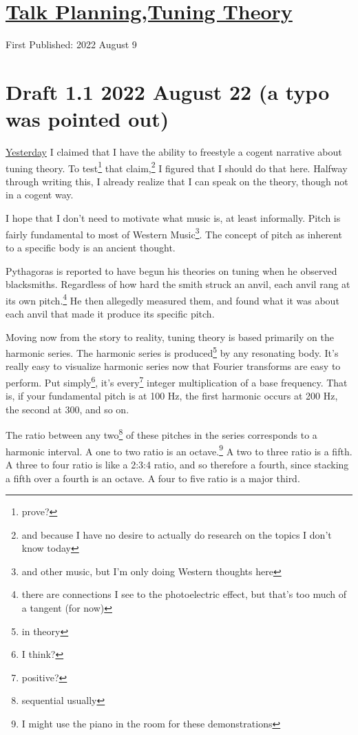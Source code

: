 \documentclass[12pt]{article}[titlepage]
\newcommand{\1}{\={a}}
\newcommand{\2}{\={e}}
\newcommand{\3}{\={\i}}
\newcommand{\4}{\=o}
\newcommand{\5}{\=u}
\newcommand{\6}{\={A}}
\renewcommand{\,}{\textsuperscript{,}}
\begin{document}
\doublespacing
\section{\href{talk-planning-2.html}{Talk Planning,Tuning Theory}}
First Published: 2022 August 9
\section{Draft 1.1 2022 August 22 (a typo was pointed out)}
\href{talk-planning-1.html}{Yesterday} I claimed that I have the ability to freestyle a cogent narrative about tuning theory.
To test\footnote{prove?} that claim,\footnote{and because I have no desire to actually do research on the topics I don't know today} I figured that I should do that here.
Halfway through writing this, I already realize that I can speak on the theory, though not in a cogent way.

I hope that I don't need to motivate what music is, at least informally.
Pitch is fairly fundamental to most of Western Music\footnote{and other music, but I'm only doing Western thoughts here}.
The concept of pitch as inherent to a specific body is an ancient thought.

Pythagoras is reported to have begun his theories on tuning when he observed blacksmiths.
Regardless of how hard the smith struck an anvil, each anvil rang at its own pitch.\footnote{there are connections I see to the photoelectric effect, but that's too much of a tangent (for now)}
He then allegedly measured them, and found what it was about each anvil that made it produce its specific pitch.

Moving now from the story to reality, tuning theory is based primarily on the harmonic series.
The harmonic series is produced\footnote{in theory} by any resonating body.
It's really easy to visualize harmonic series now that Fourier transforms are easy to perform.
Put simply\footnote{I think?}, it's every\footnote{positive?} integer multiplication of a base frequency.
That is, if your fundamental pitch is at 100 Hz, the first harmonic occurs at 200 Hz, the second at 300, and so on.

The ratio between any two\footnote{sequential usually} of these pitches in the series corresponds to a harmonic interval.
A one to two ratio is an octave.\footnote{I might use the piano in the room for these demonstrations}
A two to three ratio is a fifth.
A three to four ratio is like a 2:3:4 ratio, and so therefore a fourth, since stacking a fifth over a fourth is an octave.
A four to five ratio is a major third.
\end{document}
